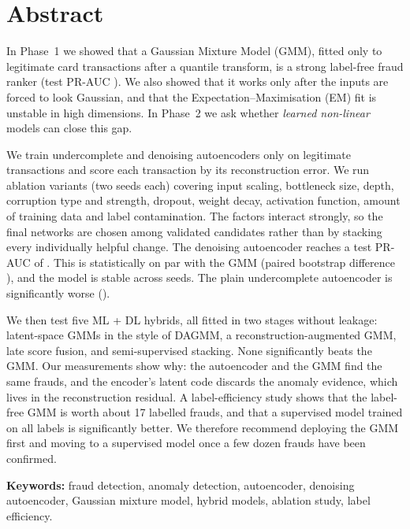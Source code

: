 \documentclass[12pt]{article}
\begin{document}

\section*{Abstract}
In Phase~1 we showed that a Gaussian Mixture Model (GMM), fitted only to legitimate card transactions after a quantile
transform, is a strong label-free fraud ranker (test PR-AUC \gmmTestAP{}). We also showed that it works only after the
inputs are forced to look Gaussian, and that the Expectation--Maximisation (EM) fit is unstable in high dimensions. In
Phase~2 we ask whether \emph{learned non-linear} models can close this gap.

We train undercomplete and denoising autoencoders only on legitimate transactions and score each transaction by its
reconstruction error. We run \nAblations{} ablation variants (two seeds each) covering input scaling, bottleneck size,
depth, corruption type and strength, dropout, weight decay, activation function, amount of training data and label
contamination. The factors interact strongly, so the final networks are chosen among validated candidates rather than
by stacking every individually helpful change. The denoising autoencoder reaches a test PR-AUC of \daeTestAP{}. This is
statistically on par with the GMM (paired bootstrap difference \sigDAEGMM{}), and the model is stable across seeds. The
plain undercomplete autoencoder is significantly worse (\aeTestAP{}).

We then test five ML + DL hybrids, all fitted in two stages without leakage: latent-space GMMs in the style of DAGMM, a
reconstruction-augmented GMM, late score fusion, and semi-supervised stacking. None significantly beats the GMM. Our
measurements show why: the autoencoder and the GMM find the same frauds, and the encoder's latent code discards the
anomaly evidence, which lives in the reconstruction residual. A label-efficiency study shows that the label-free GMM is
worth about 17 labelled frauds, and that a supervised model trained on all labels is significantly better. We
therefore recommend deploying the GMM first and moving to a supervised model once a few dozen frauds have been
confirmed.

\medskip
\textbf{Keywords:} fraud detection, anomaly detection, autoencoder, denoising autoencoder, Gaussian mixture model,
hybrid models, ablation study, label efficiency.
\end{document}
